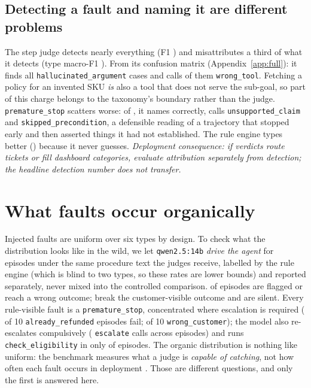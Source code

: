 \documentclass{article}
\newcommand{\ftype}[1]{\texttt{#1}}
\begin{document}
\subsection{Detecting a fault and naming it are different problems}
\label{sec:attribution}

The step judge detects nearly everything (F1 \tjStepQFone) and misattributes a third of what
it detects (type macro-F1 \tjStepQTypeF). From its confusion matrix
(Appendix~\ref{app:full}): it finds all \tjNPerType{} \ftype{hallucinated\_argument} cases
and calls \tjStepQHallucAsWrong{} of them \ftype{wrong\_tool}. Fetching a policy for an
invented SKU \emph{is} also a tool that does not serve the sub-goal, so part of this charge
belongs to the taxonomy's boundary rather than the judge. \ftype{premature\_stop} scatters
worse: of \tjNPerType{}, it names \tjStepQPremCorrect{} correctly, calls
\tjStepQPremAsUnsup{} \ftype{unsupported\_claim} and \tjStepQPremAsSkipped{}
\ftype{skipped\_precondition}, a defensible reading of a trajectory that stopped early and
then asserted things it had not established. The rule engine types better
(\tjRulesTypeF{}) because it never guesses. \emph{Deployment consequence: if verdicts route
tickets or fill dashboard categories, evaluate attribution separately from detection; the
headline detection number does not transfer.}

\section{What faults occur organically}
\label{sec:organic}

Injected faults are uniform over six types by design. To check what the distribution looks
like in the wild, we let \texttt{qwen2.5:14b} \emph{drive the agent} for \tjAgentN{} episodes
under the same procedure text the judges receive, labelled by the rule engine (which is blind
to two types, so these rates are lower bounds) and reported separately, never mixed into the
controlled comparison. \tjAgentFaulty{} of \tjAgentN{} episodes are flagged or reach a wrong
outcome; \tjAgentWrongOutcome{} break the customer-visible outcome and \tjAgentSilent{} are
silent. Every rule-visible fault is a \ftype{premature\_stop}, concentrated where escalation
is required (\tjAgentAlreadyRefundedFaulty{} of 10 \ftype{already\_refunded} episodes fail;
\tjAgentWrongCustomerFaulty{} of 10 \ftype{wrong\_customer}); the model also re-escalates
compulsively (\tjAgentEscalates{} \texttt{escalate} calls across \tjAgentN{} episodes) and
runs \texttt{check\_eligibility} in only \tjAgentEligibilityEpisodes{} of \tjAgentN{}
episodes. The organic distribution is nothing like uniform: the benchmark measures what a
judge is \emph{capable of catching}, not how often each fault occurs in deployment
\citep{just2014mutants}. Those are different questions, and only the first is answered here.
\end{document}

